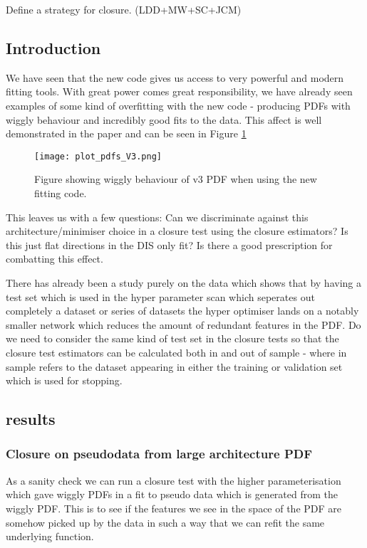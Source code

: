 Define a strategy for closure. (LDD+MW+SC+JCM)

\subsection{Introduction}

We have seen that the new \nfit code gives us access to very powerful and
modern fitting tools. With great power comes great responsibility, we have already
seen examples of some kind of overfitting with the new code - producing PDFs
with wiggly behaviour and incredibly good fits to the data. This affect is
well demonstrated in the \nfit paper and can be seen in Figure \ref{fig:v3pdf}

\begin{figure}[!h]
    \centering
    \texttt{[image: plot\_pdfs\_V3.png]}
    \caption{
        Figure showing wiggly behaviour of v3 PDF when using the new fitting code.
        }
    \label{fig:v3pdf}
\end{figure}

This leaves us with a few questions: Can we discriminate against this
architecture/minimiser choice in a closure test using the closure estimators?
Is this just flat directions in the DIS only fit? Is there a good prescription
for combatting this effect.

There has already been a study purely on the data which shows that by having a test
set which is used in the hyper parameter scan which seperates out completely a dataset
or series of datasets the hyper optimiser lands on a notably smaller network which reduces
the amount of redundant features in the PDF. Do we need to consider the same kind of test
set in the closure tests so that the closure test estimators can be calculated both in and
out of sample - where in sample refers to the dataset appearing in either the training
or validation set which is used for stopping.

\subsection{results}

\subsubsection*{Closure on pseudodata from large architecture PDF}

As a sanity check we can run a closure test with the higher parameterisation
which gave wiggly PDFs in a fit to pseudo data which is generated from the
wiggly PDF. This is to see if the features we see in the space of the PDF are
somehow picked up by the data in such a way that we can refit the same underlying
function.

